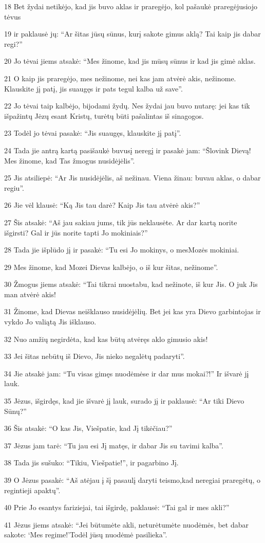 \par 18 Bet žydai netikėjo, kad jis buvo aklas ir praregėjo, kol pašaukė praregėjusiojo tėvus 
\par 19 ir paklausė jų: “Ar šitas jūsų sūnus, kurį sakote gimus aklą? Tai kaip jis dabar regi?” 
\par 20 Jo tėvai jiems atsakė: “Mes žinome, kad jis mūsų sūnus ir kad jis gimė aklas. 
\par 21 O kaip jis praregėjo, mes nežinome, nei kas jam atvėrė akis, nežinome. Klauskite jį patį, jis suaugęs ir pats tegul kalba už save”. 
\par 22 Jo tėvai taip kalbėjo, bijodami žydų. Nes žydai jau buvo nutarę: jei kas tik išpažintų Jėzų esant Kristų, turėtų būti pašalintas iš sinagogos. 
\par 23 Todėl jo tėvai pasakė: “Jis suaugęs, klauskite jį patį”. 
\par 24 Tada jie antrą kartą pasišaukė buvusį neregį ir pasakė jam: “Šlovink Dievą! Mes žinome, kad Tas žmogus nusidėjėlis”. 
\par 25 Jis atsiliepė: “Ar Jis nusidėjėlis, aš nežinau. Viena žinau: buvau aklas, o dabar regiu”. 
\par 26 Jie vėl klausė: “Ką Jis tau darė? Kaip Jis tau atvėrė akis?” 
\par 27 Šis atsakė: “Aš jau sakiau jums, tik jūs neklausėte. Ar dar kartą norite išgirsti? Gal ir jūs norite tapti Jo mokiniais?” 
\par 28 Tada jie išplūdo jį ir pasakė: “Tu esi Jo mokinys, o mes­Mozės mokiniai. 
\par 29 Mes žinome, kad Mozei Dievas kalbėjo, o iš kur šitas, nežinome”. 
\par 30 Žmogus jiems atsakė: “Tai tikrai nuostabu, kad nežinote, iš kur Jis. O juk Jis man atvėrė akis! 
\par 31 Žinome, kad Dievas neišklauso nusidėjėlių. Bet jei kas yra Dievo garbintojas ir vykdo Jo valią­tą Jis išklauso. 
\par 32 Nuo amžių negirdėta, kad kas būtų atvėręs aklo gimusio akis! 
\par 33 Jei šitas nebūtų iš Dievo, Jis nieko negalėtų padaryti”. 
\par 34 Jie atsakė jam: “Tu visas gimęs nuodėmėse ir dar mus mokai?!” Ir išvarė jį lauk. 
\par 35 Jėzus, išgirdęs, kad jie išvarė jį lauk, surado jį ir paklausė: “Ar tiki Dievo Sūnų?” 
\par 36 Šis atsakė: “O kas Jis, Viešpatie, kad Jį tikėčiau?” 
\par 37 Jėzus jam tarė: “Tu jau esi Jį matęs, ir dabar Jis su tavimi kalba”. 
\par 38 Tada jis sušuko: “Tikiu, Viešpatie!”, ir pagarbino Jį. 
\par 39 O Jėzus pasakė: “Aš atėjau į šį pasaulį daryti teismo,­kad neregiai praregėtų, o regintieji apaktų”. 
\par 40 Prie Jo esantys fariziejai, tai išgirdę, paklausė: “Tai gal ir mes akli?” 
\par 41 Jėzus jiems atsakė: “Jei būtumėte akli, neturėtumėte nuodėmės, bet dabar sakote: ‘Mes regime!’­Todėl jūsų nuodėmė pasilieka”.



